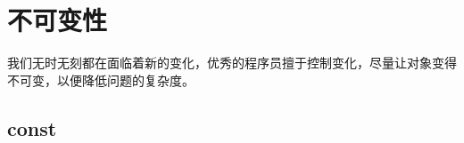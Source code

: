 \begin{savequote}[45mm]
\end{savequote}

\chapter{不可变性}
\label{ch:immutability}

\begin{content}
我们无时无刻都在面临着新的变化，优秀的程序员擅于控制变化，尽量让对象变得不可变，以便降低问题的复杂度。
\end{content}

\section{const}

